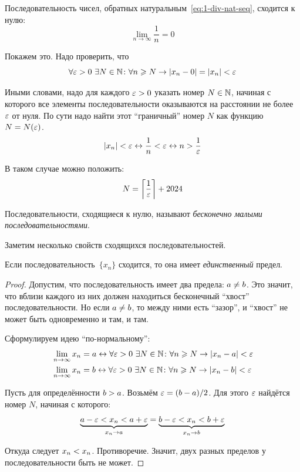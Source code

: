 \documentclass[a4paper,12pt]{article}
\begin{document}
  \begin{example}
    Последовательность чисел, обратных натуральным~\eqref{eq:1-div-nat-seq}, сходится к нулю:
    \[
      \lim_{n \to \infty} \frac{1}{n} = 0
    \]
    
    Покажем это.
    Надо проверить, что
    \[
      \forall \varepsilon > 0\ \exists N \in \mathbb N\colon \forall n \geqslant N \to |x_n - 0| = |x_n| < \varepsilon
    \]
    
    Иными словами, надо для каждого $\eps \hm> 0$ указать номер $N \hm\in \NN$, начиная с которого все элементы последовательности оказываются на расстоянии не более~$\varepsilon$ от нуля.
    По сути надо найти этот ``граничный'' номер $N$ как функцию $N \hm= N(\eps)$.
    \[
      |x_n| < \varepsilon \leftrightarrow \frac{1}{n} < \varepsilon \leftrightarrow n > \frac{1}{\varepsilon}
    \]
    
    В таком случае можно положить:
    \[
      N = \left\lceil\frac{1}{\varepsilon}\right\rceil + 2024
    \]
  \end{example}

  Последовательности, сходящиеся к нулю, называют \emph{бесконечно малыми последовательностями}.

  Заметим несколько свойств сходящихся последовательностей.
  
  \begin{proposition}
    Если последовательность~$\{x_n\}$ сходится, то она имеет \emph{единственный} предел.
  \end{proposition}
  
  \begin{proof}
    Допустим, что последовательность имеет два предела: $a \hm{\not=} b$.
    Это значит, что вблизи каждого из них должен находиться бесконечный ``хвост'' последовательности.
    Но если $a \hm{\not=} b$, то между ними есть ``зазор'', и ``хвост'' не может быть одновременно и там, и там.
    
    Сформулируем идею ``по-нормальному'':
    \[
      \begin{aligned}
        &\lim_{n \to \infty} x_n = a \leftrightarrow \forall \varepsilon > 0\ \exists N \in \mathbb N\colon \forall n \geqslant N \to |x_n - a| < \varepsilon\\
        &\lim_{n \to \infty} x_n = b \leftrightarrow \forall \varepsilon > 0\ \exists N \in \mathbb N\colon \forall n \geqslant N \to |x_n - b| < \varepsilon
      \end{aligned}
    \]
    
    Пусть для определённости $b \hm> a$.
    Возьмём $\eps \hm= (b \hm- a) \hm/ 2$.
    Для этого $\varepsilon$ найдётся номер $N$, начиная с которого:
    \[
      \underbrace{a - \varepsilon < x_n < a + \varepsilon}_{x_n \to a} = \underbrace{b - \varepsilon < x_n < b + \varepsilon}_{x_n \to b}
    \]
    
    Откуда следует $x_n \hm< x_n$.
    Противоречие.
    Значит, двух разных пределов у последовательности быть не может.
  \end{proof}
  
\end{document}
